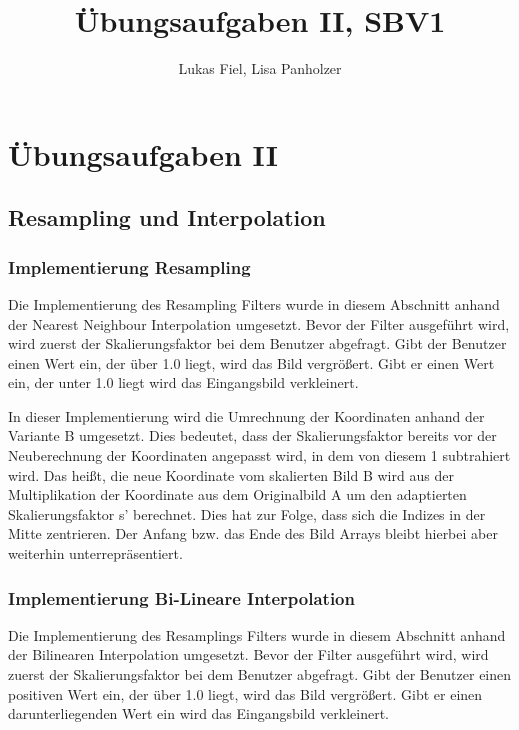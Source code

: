 \documentclass[12pt,german]{article}
\begin{document}
\title{Übungsaufgaben II, SBV1 }
\author{Lukas Fiel, Lisa Panholzer}
\maketitle


\newpage
\section{Übungsaufgaben II}
\subsection{Resampling und Interpolation}
\subsubsection{Implementierung Resampling}
Die Implementierung des Resampling Filters wurde in diesem Abschnitt anhand der Nearest Neighbour Interpolation umgesetzt. Bevor der Filter ausgeführt wird, wird zuerst der Skalierungsfaktor bei dem Benutzer abgefragt. Gibt der Benutzer einen Wert ein, der über 1.0 liegt, wird das Bild vergrößert. Gibt er einen Wert ein, der unter 1.0 liegt wird das Eingangsbild verkleinert.

In dieser Implementierung wird die Umrechnung der Koordinaten anhand der Variante B umgesetzt. Dies bedeutet, dass der Skalierungsfaktor bereits vor der Neuberechnung der Koordinaten angepasst wird, in dem von diesem 1 subtrahiert wird. Das heißt, die neue Koordinate vom skalierten Bild B wird aus der Multiplikation der Koordinate aus dem Originalbild A um den adaptierten Skalierungsfaktor s' berechnet. Dies hat zur Folge, dass sich die Indizes in der Mitte zentrieren. Der Anfang bzw. das Ende des Bild Arrays bleibt hierbei aber weiterhin unterrepräsentiert.\\



\subsubsection{Implementierung Bi-Lineare Interpolation}
Die Implementierung des Resamplings Filters wurde in diesem Abschnitt anhand der Bilinearen Interpolation umgesetzt. Bevor der Filter ausgeführt wird, wird zuerst der Skalierungsfaktor bei dem Benutzer abgefragt. Gibt der Benutzer einen positiven Wert ein, der über 1.0 liegt, wird das Bild vergrößert. Gibt er einen darunterliegenden Wert ein wird das Eingangsbild verkleinert.
\end{document}
